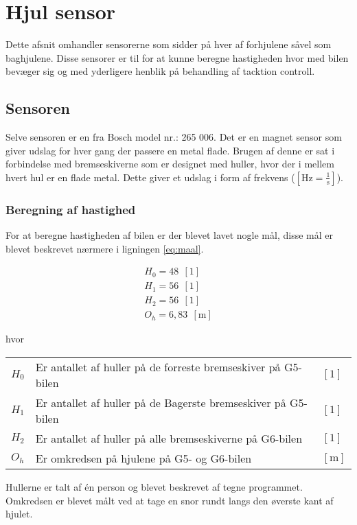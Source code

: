 \documentclass[12pt,a4paper]{report}
\begin{document}
\chapter{Hjul sensor}
Dette afsnit omhandler sensorerne som sidder på hver af forhjulene såvel som baghjulene. Disse sensorer er til for at kunne beregne hastigheden hvor med bilen bevæger sig og med yderligere henblik på behandling af tacktion controll.

\section{Sensoren}
Selve sensoren er en fra Bosch model nr.: 265 006. Det er en magnet sensor som giver udslag for hver gang der passere en metal flade. Brugen af denne er sat i forbindelse med bremseskiverne som er designet med huller, hvor der i mellem hvert hul er en flade metal. Dette giver et udslag i form af frekvens ($\left[\text{Hz} = \frac{1}{\text{s}}\right]$).

\subsection*{Beregning af hastighed}
For at beregne hastigheden af bilen er der blevet lavet nogle mål, disse mål er blevet beskrevet nærmere i ligningen \ref{eq:maal}.

\begin{center}
	\begin{subequations} \label{eq:maal}
		\begin{align}
H_{0} = 48 ~~ \left[\text{1}\right] \\
H_{1} = 56 ~~ \left[\text{1}\right] \\
H_{2} = 56 ~~ \left[\text{1}\right] \\
O_{h} = 6,83 ~~ \left[\text{m}\right]
		\end{align}	
	\end{subequations}
\end{center}
hvor
\begin{center}
	\begin{tabular}{ l l l }
	  $H_{0}$ & Er antallet af huller på de forreste bremseskiver på G5-bilen & $\left[1\right]$ \\
	  $H_{1}$ & Er antallet af huller på de Bagerste bremseskiver på G5-bilen & $\left[1\right]$\\
	  $H_{2}$ & Er antallet af huller på alle bremseskiverne på G6-bilen & $\left[1\right]$ \\
	  $O_{h}$ & Er omkredsen på hjulene på G5- og G6-bilen & $\left[\text{m}\right]$ \\
	\end{tabular}  
\end{center}  
Hullerne er talt af én person og blevet beskrevet af tegne programmet. Omkredsen er blevet målt ved at tage en snor rundt langs den øverste kant af hjulet.
\end{document}
